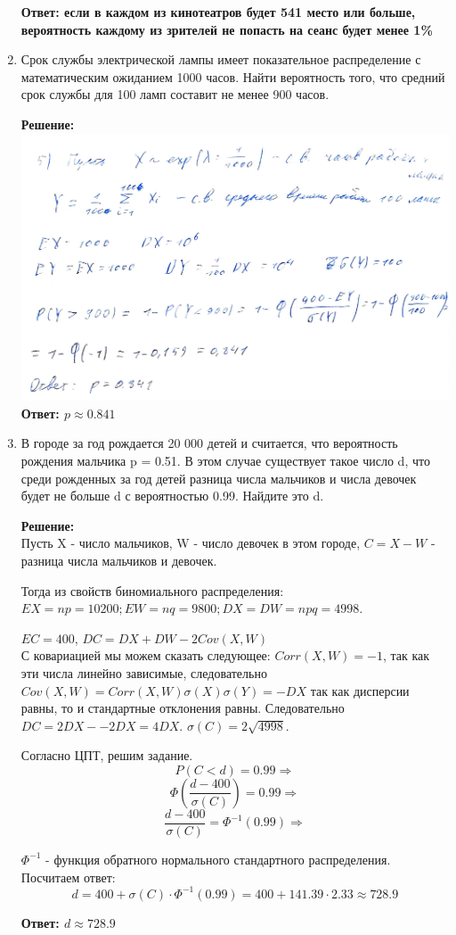 \documentclass[a4paper,12pt]{article}
\begin{document}
\begin{enumerate}
\textbf{Ответ: если в каждом из кинотеатров будет 541 место или больше, вероятность каждому из зрителей не попасть на сеанс будет менее 1\%} 




\item Срок службы электрической лампы имеет показательное распределение с математическим ожиданием 1000 часов. Найти вероятность того, что средний срок службы для 100 ламп составит не менее 900 часов. 

\textbf{Решение:}\\
\includegraphics[width=\textwidth]{img/hw5t5.pdf}
\textbf{Ответ: $p \approx 0.841 $} 


\item В городе за год рождается 20 000 детей и считается, что вероятность рождения мальчика p = 0.51. В этом случае существует такое число d, что среди рожденных за год детей разница числа мальчиков и числа девочек будет не больше d с вероятностью 0.99. Найдите это d.

\textbf{Решение:}\\

Пусть X - число мальчиков, W - число девочек в этом городе, $C=X-W$ - разница числа мальчиков и девочек. 

Тогда из свойств биномиального распределения:
$EX=np = 10200; EW = nq = 9800; DX=DW = npq=4998$.

$EC = 400$, $DC = DX + DW -2 Cov(X,W)$\\
С ковариацией мы можем сказать следующее: $Corr(X,W)=-1$, так как эти числа линейно зависимые, следовательно $Cov(X,W) = Corr(X,W)\sigma(X)\sigma(Y)=-DX$ так как дисперсии равны, то и стандартные отклонения равны. Следовательно $DC=2DX- -2DX = 4DX$. $\sigma(C) = 2\sqrt{4998}$.

Согласно ЦПТ, решим задание.
$$P(C<d) = 0.99 \Rightarrow$$
$$\Phi(\frac{d-400}{\sigma(C)})=0.99 \Rightarrow$$
$$\frac{d-400}{\sigma(C)}=\Phi^{-1}(0.99) \Rightarrow$$

$\Phi^{-1}$ - функция обратного нормального стандартного распределения. Посчитаем ответ:
$$d = 400+\sigma(C) \cdot \Phi^{-1}(0.99) = 400 + 141.39 \cdot 2.33 \approx 728.9 $$

\textbf{Ответ: $d \approx 728.9 $} 

\end{enumerate}
\end{document}
